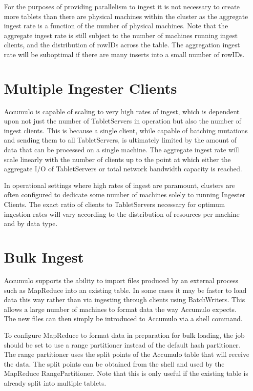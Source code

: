 For the purposes of providing parallelism to ingest it is not necessary to create more
tablets than there are physical machines within the cluster as the aggregate ingest
rate is a function of the number of physical machines. Note that the aggregate ingest
rate is still subject to the number of machines running ingest clients, and the
distribution of rowIDs across the table. The aggregation ingest rate will be
suboptimal if there are many inserts into a small number of rowIDs.

\section{Multiple Ingester Clients}

Accumulo is capable of scaling to very high rates of ingest, which is dependent upon
not just the number of TabletServers in operation but also the number of ingest
clients. This is because a single client, while capable of batching mutations and
sending them to all TabletServers, is ultimately limited by the amount of data that
can be processed on a single machine. The aggregate ingest rate will scale linearly
with the number of clients up to the point at which either the aggregate I/O of
TabletServers or total network bandwidth capacity is reached.

In operational settings where high rates of ingest are paramount, clusters are often
configured to dedicate some number of machines solely to running Ingester Clients.
The exact ratio of clients to TabletServers necessary for optimum ingestion rates
will vary according to the distribution of resources per machine and by data type.

\section{Bulk Ingest}

Accumulo supports the ability to import files produced by an external process such
as MapReduce into an existing table. In some cases it may be faster to load data this
way rather than via ingesting through clients using BatchWriters. This allows a large
number of machines to format data the way Accumulo expects. The new files can
then simply be introduced to Accumulo via a shell command.

To configure MapReduce to format data in preparation for bulk loading, the job
should be set to use a range partitioner instead of the default hash partitioner. The
range partitioner uses the split points of the Accumulo table that will receive the
data. The split points can be obtained from the shell and used by the MapReduce
RangePartitioner. Note that this is only useful if the existing table is already split
into multiple tablets.

